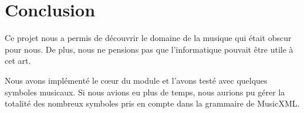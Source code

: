 \section{Conclusion}

Ce projet nous a permis de découvrir le domaine de la musique qui était obscur pour nous. De plus, nous ne pensions pas que l'informatique pouvait être utile à cet art.

\par
Nous avons implémenté le cœur du module et l'avons testé avec quelques symboles musicaux. Si nous avions eu plus de temps, nous aurions pu gérer la totalité des nombreux symboles pris en compte dans la grammaire de MusicXML.




